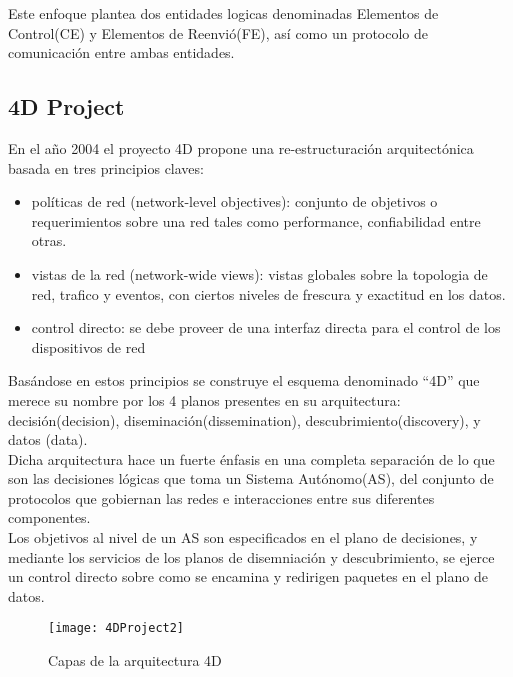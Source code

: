Este enfoque plantea dos entidades logicas denominadas Elementos de Control(CE) y Elementos de Reenvió(FE), así como un protocolo de comunicación entre ambas entidades.

\subsection{4D Project}
En el año 2004 el proyecto 4D \citep{rexford2004network}\citep{greenberg2005clean} propone una re-estructuración arquitectónica basada en tres principios claves: 

\begin{itemize}
\item políticas de red (network-level objectives): conjunto de objetivos o requerimientos sobre una red tales como performance, confiabilidad entre otras.

\item vistas de la red (network-wide views): vistas globales sobre la topologia de red, trafico y eventos, con ciertos niveles de frescura y exactitud en los datos.

\item control directo: se debe proveer de una interfaz directa para el control de los dispositivos de red
\end{itemize}

Basándose en estos principios se construye el esquema denominado ``4D'' que merece su nombre por los 4 planos presentes en su arquitectura: decisión(decision), diseminación(dissemination), descubrimiento(discovery), y datos (data).\\

Dicha arquitectura hace un fuerte énfasis en una completa separación de lo que son las decisiones lógicas que toma un Sistema Autónomo(AS), del conjunto de protocolos que gobiernan las redes e interacciones entre sus diferentes componentes.\\

Los objetivos al nivel de un AS son especificados en el plano de decisiones, y mediante los servicios de los planos de disemniación y descubrimiento, se ejerce un control directo sobre como se encamina y redirigen paquetes en el plano de datos.\\

\begin{figure}[htbp!] 
\centering    
\texttt{[image: 4DProject2]}
\caption[Capas de la arquitectura 4D]{Capas de la arquitectura 4D}
\label{fig:4DProject}
\end{figure}

